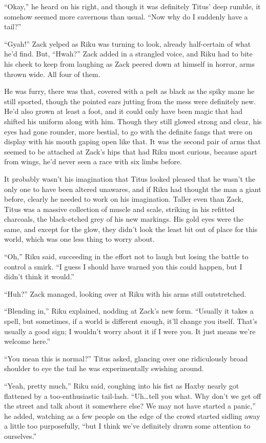 ``Okay,'' he heard on his right, and though it was definitely Titus' deep rumble, it somehow seemed more cavernous than usual. ``Now why do I suddenly have a tail?''

``Gyah!'' Zack yelped as Riku was turning to look, already half-certain of what he'd find. But, ``Hwah?'' Zack added in a strangled voice, and Riku had to bite his cheek to keep from laughing as Zack peered down at himself in horror, arms thrown wide. All four of them.

He was furry, there was that, covered with a pelt as black as the spiky mane he still sported, though the pointed ears jutting from the mess were definitely new. He'd also grown at least a foot, and it could only have been magic that had shifted his uniform along with him. Though they still glowed strong and clear, his eyes had gone rounder, more bestial, to go with the definite fangs that were on display with his mouth gaping open like that. It was the second pair of arms that seemed to be attached at Zack's hips that had Riku most curious, because apart from wings, he'd never seen a race with six limbs before.

It probably wasn't his imagination that Titus looked pleased that he wasn't the only one to have been altered unawares, and if Riku had thought the man a giant before, clearly he needed to work on his imagination. Taller even than Zack, Titus was a massive collection of muscle and scale, striking in his refitted charcoals, the black-etched grey of his new markings. His gold eyes were the same, and except for the glow, they didn't look the least bit out of place for this world, which was one less thing to worry about.

``Oh,'' Riku said, succeeding in the effort not to laugh but losing the battle to control a smirk. ``I guess I should have warned you this could happen, but I didn't think it would.''

``Huh?'' Zack managed, looking over at Riku with his arms still outstretched.

``Blending in,'' Riku explained, nodding at Zack's new form. ``Usually it takes a spell, but sometimes, if a world is different enough, it'll change you itself. That's usually a good sign; I wouldn't worry about it if I were you. It just means we're welcome here.''

``You mean this is normal?'' Titus asked, glancing over one ridiculously broad shoulder to eye the tail he was experimentally swishing around.

``Yeah, pretty much,'' Riku said, coughing into his fist as Haxby nearly got flattened by a too-enthusiastic tail-lash. ``Uh\ldots tell you what. Why don't we get off the street and talk about it somewhere else? We may not have started a panic,'' he added, watching as a few people on the edge of the crowd started sidling away a little too purposefully, ``but I think we've definitely drawn some attention to ourselves.''

